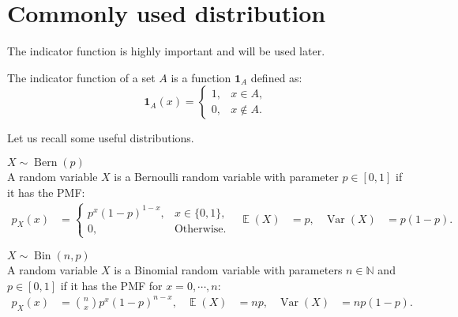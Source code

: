 \documentclass{huhtakm-template-book-v2}
\DeclareMathOperator{\E}{\mathbb{E}}
\DeclareMathOperator{\Var}{Var}
\DeclareMathOperator{\Bern}{Bern}
\DeclareMathOperator{\Bin}{Bin}
\begin{document}
\section{Commonly used distribution}
    The indicator function is highly important and will be used later.
    \begin{defn}
        The indicator function of a set $A$ is a function $\mathbf{1}_{A}$ defined as:
        \begin{equation*}
            \mathbf{1}_{A}(x) = \begin{cases}
                1, &x \in A,\\
                0, &x \not\in A.
            \end{cases}
        \end{equation*}
    \end{defn}
    Let us recall some useful distributions.
    \begin{eg} $X \sim \Bern(p)$\\
        A random variable $X$ is a Bernoulli random variable with parameter $p \in [0, 1]$ if it has the PMF:
        \begin{align*}
            p_{X}(x) &= \begin{cases}
                p^{x}(1 - p)^{1 - x}, &x \in \{0, 1\},\\
                0, &\text{Otherwise}.
            \end{cases} & \E(X) &= p, & \Var(X) &= p(1 - p).
        \end{align*}
    \end{eg}
    \begin{eg} $X \sim \Bin(n, p)$\\
        A random variable $X$ is a Binomial random variable with parameters $n \in \mathbb{N}$ and $p \in [0, 1]$ if it has the PMF for $x = 0, \cdots, n$:
        \begin{align*}
            p_{X}(x) &= \binom{n}{x} p^{x}(1 - p)^{n - x}, & \E(X) &= np, & \Var(X) &= np(1 - p).
        \end{align*}
    \end{eg}
    \newpage
\end{document}
